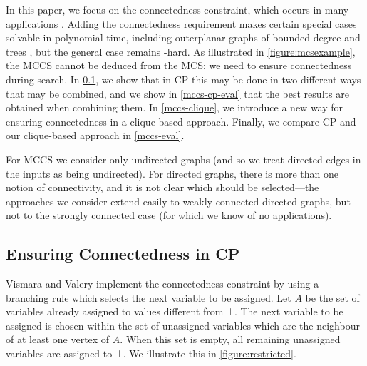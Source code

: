 \documentclass{llncs}
\begin{document}
In this paper, we focus on the connectedness constraint, which occurs in many applications
\cite{DBLP:journals/tcs/Koch01,DBLP:journals/jcamd/RaymondW02a,DBLP:conf/mco/VismaraV08,Ehrlich:2011}.
Adding the connectedness requirement makes certain special cases solvable in polynomial time,
including outerplanar graphs of bounded degree \cite{DBLP:journals/algorithms/AkutsuT13} and trees
\cite{droschinsky_et_al:LIPIcs:2016:xxxx}, but the general case remains \NP-hard. As illustrated in
\cref{figure:mcsexample}, the MCCS cannot be deduced from the MCS: we need to ensure connectedness
during search. In \cref{mccs-cp}, we show that in CP this may be done in two different ways that
may be combined, and we show in \cref{mccs-cp-eval} that the best results are obtained when
combining them. In \cref{mccs-clique}, we introduce a new way for ensuring connectedness in a
clique-based approach. Finally, we compare CP and our clique-based approach in \cref{mccs-eval}.

For MCCS we consider only undirected graphs (and so we treat directed edges in the inputs as being
undirected). For directed graphs, there is more than one notion of connectivity, and it is not clear
which should be selected---the approaches we consider extend easily to weakly connected directed
graphs, but not to the strongly connected case (for which we know of no applications).

\subsection{Ensuring Connectedness in CP}\label{mccs-cp}

Vismara and Valery \cite{DBLP:conf/mco/VismaraV08} implement the connectedness constraint by using a
branching rule which selects the next variable to be assigned. Let $A$ be the
set of variables already assigned to values different from $\bot$. The next variable to be assigned
is chosen within the set of unassigned variables which are the neighbour of at least one vertex of
$A$.  When this set is empty, all remaining unassigned variables are assigned to
$\bot$. We illustrate this in \cref{figure:restricted}.
\end{document}
